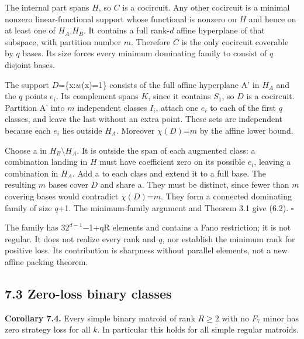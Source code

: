 \documentclass[11pt]{article}
\begin{document}
The internal part spans \(H\), so \(C\) is a cocircuit. Any other cocircuit is a minimal nonzero linear-functional support whose functional is nonzero on \(H\) and hence on at least one of \(H_A\),\(H_B\). It contains a full rank-\(d\) affine hyperplane of that subspace, with partition number \(m\). Therefore \(C\) is the only cocircuit coverable by \(q\) bases. Its size forces every minimum dominating family to consist of \(q\) disjoint bases.

The support \(D\)=\{x:\(w\)(x)=1\} consists of the full affine hyperplane A' in \(H_A\) and the \(q\) points \(e_i\). Its complement spans \(K\), since it contains \(S_1\), so \(D\) is a cocircuit. Partition A' into \(m\) independent classes \(I_i\), attach one \(e_i\) to each of the first \(q\) classes, and leave the last without an extra point. These sets are independent because each \(e_i\) lies outside \(H_A\). Moreover \(\chi(D)\)=\(m\) by the affine lower bound.

Choose a in \(H_B\setminus H_A\). It is outside the span of each augmented class: a combination landing in \(H\) must have coefficient zero on its possible \(e_i\), leaving a combination in \(H_A\). Add a to each class and extend it to a full base. The resulting \(m\) bases cover \(D\) and share a. They must be distinct, since fewer than \(m\) covering bases would contradict \(\chi(D)\)=\(m\). They form a connected dominating family of size \(q\)+1. The minimum-family argument and Theorem 3.1 give (6.2). \hfill\ensuremath{\square}

The family has 3\textperiodcentered{}\(2^{d-1}\)\ensuremath{-}1+qR elements and contains a Fano restriction; it is not regular. It does not realize every rank and \(q\), nor establish the minimum rank for positive loss. Its contribution is sharpness without parallel elements, not a new affine packing theorem.

\subsection*{7.3 Zero-loss binary classes}

\textbf{Corollary 7.4.} Every simple binary matroid of rank \(R\ge2\) with no \(F_7\) minor has zero strategy loss for all \(k\). In particular this holds for all simple regular matroids.
\end{document}

